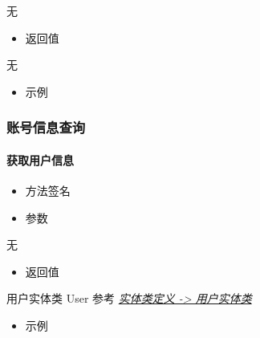 \documentclass[letterpaper,10pt,english]{sphinxmanual}
\begin{document}
无
\begin{itemize}
\item {} 
返回值

\end{itemize}

无
\begin{itemize}
\item {} 
示例

\end{itemize}

%
\begin{sphinxVerbatim}[commandchars=\\\{\}]
   
\end{sphinxVerbatim}


\subsubsection{账号信息查询}
\label{\detokenize{csharp:id14}}

\paragraph{获取用户信息}
\label{\detokenize{csharp:id15}}\begin{itemize}
\item {} 
方法签名

\end{itemize}

%
\begin{sphinxVerbatim}[commandchars=\\\{\}]
  
\end{sphinxVerbatim}
\begin{itemize}
\item {} 
参数

\end{itemize}

无
\begin{itemize}
\item {} 
返回值

\end{itemize}

用户实体类 User 参考 {\hyperref[\detokenize{csharp:user}]{\emph{实体类定义 -\textgreater{} 用户实体类}}}
\begin{itemize}
\item {} 
示例

\end{itemize}
\end{document}

